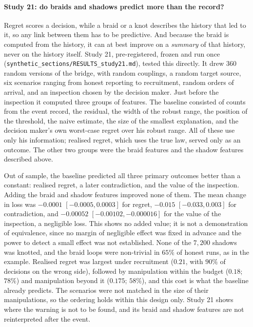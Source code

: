 \documentclass[11pt]{article}
\theoremstyle{definition}\newtheorem{definition}[theorem]{Definition}\newtheorem{remark}[theorem]{Remark}\newtheorem{example}[theorem]{Example}\newtheorem{problem}[theorem]{Open problem}\crefname{problem}{Problem}{Problems}
\begin{document}
\paragraph{Study 21: do braids and shadows predict more than the record?} Regret scores a decision, while a braid or a knot describes the history that led to it, so any link between them has to be predictive. And because the braid is computed from the history, it can at best improve on a \emph{summary} of that history, never on the history itself. Study 21, pre-registered, frozen and run once (\texttt{synthetic\_sections/RESULTS\_study21.md}), tested this directly. It drew $360$ random versions of the bridge, with random couplings, a random target source, six scenarios ranging from honest reporting to recruitment, random orders of arrival, and an inspection chosen by the decision maker. Just before the inspection it computed three groups of features. The baseline consisted of counts from the event record, the residual, the width of the robust range, the position of the threshold, the naive estimate, the size of the smallest explanation, and the decision maker's own worst-case regret over his robust range. All of these use only his information; realised regret, which uses the true law, served only as an outcome. The other two groups were the braid features and the shadow features described above.

Out of sample, the baseline predicted all three primary outcomes better than a constant: realised regret, a later contradiction, and the value of the inspection. Adding the braid and shadow features improved none of them. The mean change in loss was $-0.0001$ $[-0.0005,0.0003]$ for regret, $-0.015$ $[-0.033,0.003]$ for contradiction, and $-0.00052$ $[-0.00102,-0.000016]$ for the value of the inspection, a negligible loss. This shows no added value; it is not a demonstration of equivalence, since no margin of negligible effect was fixed in advance and the power to detect a small effect was not established. None of the $7{,}200$ shadows was knotted, and the braid loops were non-trivial in $65\%$ of honest runs, as in the example. Realised regret was largest under recruitment ($0.21$, with $90\%$ of decisions on the wrong side), followed by manipulation within the budget ($0.18$; $78\%$) and manipulation beyond it ($0.175$; $58\%$), and this cost is what the baseline already predicts. The scenarios were not matched in the size of their manipulations, so the ordering holds within this design only. Study 21 shows where the warning is not to be found, and its braid and shadow features are not reinterpreted after the event.
\end{document}
